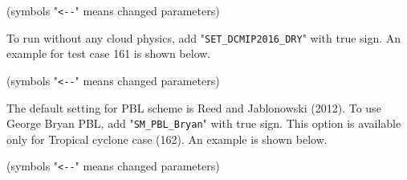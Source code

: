  (symbols "\verb|<--|" means changed parameters)



 \noindent To run without any cloud physics, add "\verb|SET_DCMIP2016_DRY|" with true sign.
 An example for test case 161 is shown below.

 (symbols "\verb|<--|" means changed parameters)


 \noindent The default setting for PBL scheme is Reed and Jablonowski (2012).
 To use George Bryan PBL, add "\verb|SM_PBL_Bryan|" with true sign.
 This option is available only for Tropical cyclone case (162).
 An example is shown below.

 (symbols "\verb|<--|" means changed parameters)


